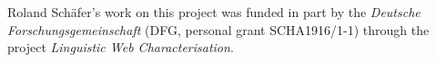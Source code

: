 

Roland Schäfer's work on this project was funded in part by the \textit{Deutsche Forschungsgemeinschaft} (DFG, personal grant SCHA1916/1-1) through the project \textit{Linguistic Web Characterisation}.
